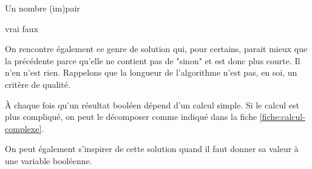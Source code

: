 \begin{Fiche}{Un nombre (im)pair}
	\begin{minipage}{7.5cm}
		\begin{LDA}
				\Return vrai
			\EndIf
			\Return faux
		\EndAlgo
		\end{LDA}
	\end{minipage}
	\quad
	\begin{minipage}{6cm}
		On rencontre également ce genre de solution
		qui, pour certains, 
		parait mieux que la précédente 
		parce qu'elle ne contient pas de "sinon"
		et est donc plus courte.
		Il n'en n'est rien.
		Rappelons que la longueur de l'algorithme
		n'est pas, en soi, un critère de qualité. 
	\end{minipage}
	

	À chaque fois qu'un résultat booléen dépend d'un calcul simple.
	Si le calcul est plus compliqué, on peut le décomposer comme
	indiqué dans la fiche \vref{fiche:calcul-complexe}.
	
	On peut également s'inspirer de cette solution
	quand il faut donner sa valeur à une variable booléenne.
		
\end{Fiche}
